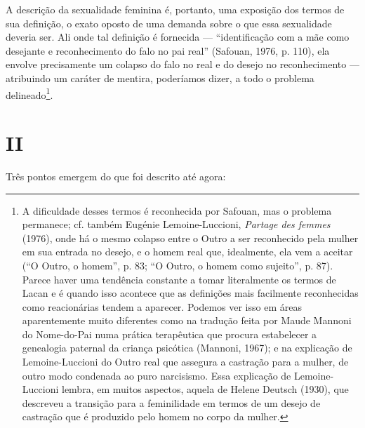A descrição da sexualidade feminina é, portanto, uma exposição dos
termos de sua definição, o exato oposto de uma demanda sobre o que essa
sexualidade deveria ser. Ali onde tal definição é fornecida ---
``identificação com a mãe como desejante e reconhecimento do falo no pai
real'' (Safouan, 1976, p. 110), ela envolve precisamente um colapso do
falo no real e do desejo no reconhecimento ­--- atribuindo um caráter de
mentira, poderíamos dizer, a todo o problema delineado\footnote{A
  dificuldade desses termos é reconhecida por Safouan, mas o problema
  permanece; cf. também Eugénie Lemoine-Luccioni, \emph{Partage des
  femmes} (1976), onde há o mesmo colapso entre o Outro a ser
  reconhecido pela mulher em sua entrada no desejo, e o homem real que,
  idealmente, ela vem a aceitar (``O Outro, o homem'', p. 83; ``O Outro,
  o homem como sujeito'', p. 87). Parece haver uma tendência constante a
  tomar literalmente os termos de Lacan e é quando isso acontece que as
  definições mais facilmente reconhecidas como reacionárias tendem a
  aparecer. Podemos ver isso em áreas aparentemente muito diferentes
  como na tradução feita por Maude Mannoni do Nome-do-Pai numa prática
  terapêutica que procura estabelecer a genealogia paternal da criança
  psicótica (Mannoni, 1967); e na explicação de Lemoine-Luccioni do
  Outro real que assegura a castração para a mulher, de outro modo
  condenada ao puro narcisismo. Essa explicação de Lemoine-Luccioni
  lembra, em muitos aspectos, aquela de Helene Deutsch (1930), que
  descreveu a transição para a feminilidade em termos de um desejo de
  castração que é produzido pelo homem no corpo da mulher.}.

\section{II}

Três pontos emergem do que foi descrito até agora:

